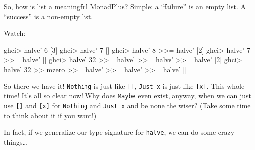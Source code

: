 \documentclass[]{article}
\newenvironment{Shaded}{}{}
\newcommand{\KeywordTok}[1]{\textcolor[rgb]{0.00,0.44,0.13}{\textbf{{#1}}}}
\newcommand{\DataTypeTok}[1]{\textcolor[rgb]{0.56,0.13,0.00}{{#1}}}
\newcommand{\DecValTok}[1]{\textcolor[rgb]{0.25,0.63,0.44}{{#1}}}
\newcommand{\CommentTok}[1]{\textcolor[rgb]{0.38,0.63,0.69}{\textit{{#1}}}}
\newcommand{\OtherTok}[1]{\textcolor[rgb]{0.00,0.44,0.13}{{#1}}}
\newcommand{\FunctionTok}[1]{\textcolor[rgb]{0.02,0.16,0.49}{{#1}}}
\newcommand{\NormalTok}[1]{{#1}}
\begin{document}
So, how is list a meaningful MonadPlus? Simple: a ``failure'' is an
empty list. A ``success'' is a non-empty list.

Watch:

\begin{Shaded}
\begin{Highlighting}[]
\NormalTok{ghci}\FunctionTok{>} \NormalTok{halve' }\DecValTok{6}
\NormalTok{[}\DecValTok{3}\NormalTok{]}
\NormalTok{ghci}\FunctionTok{>} \NormalTok{halve' }\DecValTok{7}
\NormalTok{[]}
\NormalTok{ghci}\FunctionTok{>} \NormalTok{halve' }\DecValTok{8} \FunctionTok{>>=} \NormalTok{halve'}
\NormalTok{[}\DecValTok{2}\NormalTok{]}
\NormalTok{ghci}\FunctionTok{>} \NormalTok{halve' }\DecValTok{7} \FunctionTok{>>=} \NormalTok{halve'}
\NormalTok{[]}
\NormalTok{ghci}\FunctionTok{>} \NormalTok{halve' }\DecValTok{32} \FunctionTok{>>=} \NormalTok{halve' }\FunctionTok{>>=} \NormalTok{halve' }\FunctionTok{>>=} \NormalTok{halve'}
\NormalTok{[}\DecValTok{2}\NormalTok{]}
\NormalTok{ghci}\FunctionTok{>} \NormalTok{halve' }\DecValTok{32} \FunctionTok{>>} \NormalTok{mzero }\FunctionTok{>>=} \NormalTok{halve' }\FunctionTok{>>=} \NormalTok{halve' }\FunctionTok{>>=} \NormalTok{halve'}
\NormalTok{[]}
\end{Highlighting}
\end{Shaded}

So there we have it! \texttt{Nothing} is just like \texttt{{[}{]}},
\texttt{Just\ x} is just like \texttt{{[}x{]}}. This whole time! It's
all so clear now! Why does \texttt{Maybe} even exist, anyway, when we
can just use \texttt{{[}{]}} and \texttt{{[}x{]}} for \texttt{Nothing}
and \texttt{Just\ x} and be none the wiser? (Take some time to think
about it if you want!)

In fact, if we generalize our type signature for \texttt{halve}, we can
do some crazy things\ldots{}

\begin{Shaded}
\end{Shaded}
\end{document}
